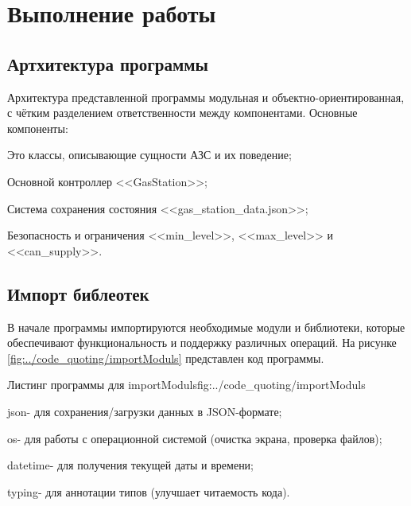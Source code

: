 \documentclass{vvsu}
\begin{document}
\section{Выполнение работы}
\label{sec:execution}

  \subsection{Артхитектура программы}
  Архитектура представленной программы модульная и объектно-ориентированная, с чётким разделением ответственности между компонентами.
  Основные компоненты:
\begin{vvsu_itemize}
  \item Это классы, описывающие сущности АЗС и их поведение;
  \item Основной контроллер <<GasStation>>;
  \item Система сохранения состояния <<gas\_station\_data.json>>;
  \item Безопасность и ограничения <<min\_level>>, <<max\_level>> и <<can\_supply>>.
\end{vvsu_itemize}


\subsection{Импорт библеотек}
  В начале программы импортируются необходимые модули и библиотеки, которые обеспечивают функциональность и поддержку различных операций.
На рисунке \ref{fig:../code_quoting/importModuls} представлен код программы.

\begin{vvsu_figure}{Листинг программы для importModuls}{fig:../code_quoting/importModuls}
  \begin{minipage}{.75\textwidth}
    
  \end{minipage}
\end{vvsu_figure}

\begin{vvsu_itemize}
  \item json- для сохранения/загрузки данных в JSON-формате;
  \item os- для работы с операционной системой (очистка экрана, проверка файлов);
  \item datetime- для получения текущей даты и времени;
  \item typing- для аннотации типов (улучшает читаемость кода).
\end{vvsu_itemize}
  
\end{document}
